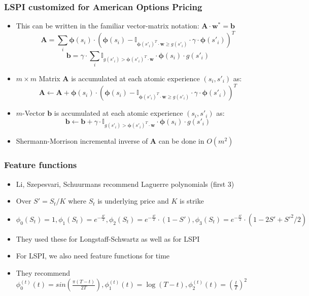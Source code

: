 \documentclass{beamer}
\begin{document}
\begin{frame}
\frametitle{LSPI customized for American Options Pricing}
\pause
\begin{itemize}[<+->]
\item This can be written in the familiar vector-matrix notation: $\bm{A} \cdot \bm{w}^* = \bm{b}$
$$\bm{A} = \sum_i \bm{\phi}(s_i) \cdot (\bm{\phi}(s_i) - \mathbb{I}_{\bm{\phi}(s'_i)^T  \cdot \bm{w} \geq g(s'_i)} \cdot \gamma \cdot \bm{\phi}(s'_i))^T$$
$$\bm{b} = \gamma \cdot \sum_i \mathbb{I}_{g(s'_i)  > \bm{\phi}(s'_i)^T \cdot  \bm{w}} \cdot \bm{\phi}(s_i) \cdot  g(s'_i)$$
\item $m \times m$ Matrix $\bm{A}$ is accumulated at each atomic experience $(s_i,s'_i)$ as:
$$\bm{A} \leftarrow \bm{A} + \bm{\phi}(s_i) \cdot (\bm{\phi}(s_i) -  \mathbb{I}_{\bm{\phi}(s'_i)^T \cdot \bm{w} \geq g(s'_i)} \cdot \gamma \cdot \bm{\phi}(s'_i))^T$$
\item $m$-Vector $\bm{b}$ is accumulated at each atomic experience $(s_i, s'_i)$ as:
$$\bm{b} \leftarrow \bm{b} + \gamma  \cdot \mathbb{I}_{g(s'_i) > \bm{\phi}(s'_i)^T  \cdot \bm{w}} \cdot \bm{\phi}(s_i) \cdot g(s'_i)$$
\item Shermann-Morrison incremental inverse of $\bm{A}$ can be done in $O(m^2)$
\end{itemize}
\end{frame}


\begin{frame}
\frametitle{Feature functions}
\pause
\begin{itemize}[<+->]
\item Li, Szepesvari, Schuurmans recommend Laguerre polynomials (first 3)
\item Over $S' = S_t/K$ where $S_t$ is underlying price and $K$ is strike
\item $\phi_0(S_t) = 1, \phi_1(S_t) = e^{-\frac {S'} 2}, \phi_2(S_t) = e^{-\frac{S'} 2} \cdot (1-S'), \phi_3(S_t) = e^{-\frac{S'} 2} \cdot (1-2S'+S'^2/2)$
\item They used these for Longstaff-Schwartz as well as for LSPI
\item For LSPI, we also need feature functions for time
\item They recommend $\phi_0^{(t)}(t) = sin(\frac {\pi(T-t)} {2T}), \phi_1^{(t)}(t) = \log(T-t), \phi_2^{(t)}(t) = (\frac t T)^2$
\end{itemize}
\end{frame}
\end{document}
